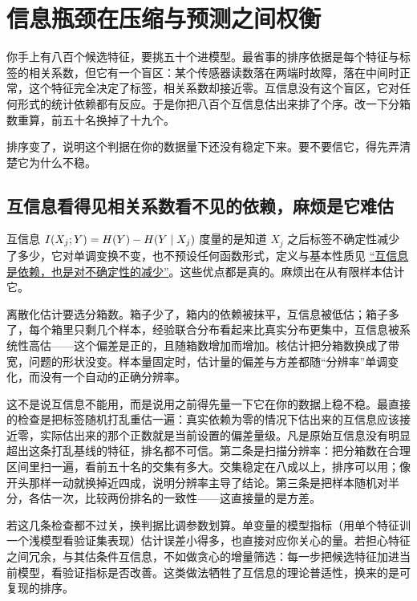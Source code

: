 \section{信息瓶颈在压缩与预测之间权衡}
\label{sec:13-Machine-Learning/11-Information-Theoretic-Learning/04}

你手上有八百个候选特征，要挑五十个进模型。最省事的排序依据是每个特征与标签的相关系数，但它有一个盲区：某个传感器读数落在两端时故障，落在中间时正常，这个特征完全决定了标签，相关系数却接近零。互信息没有这个盲区，它对任何形式的统计依赖都有反应。于是你把八百个互信息估出来排了个序。改一下分箱数重算，前五十名换掉了十九个。

排序变了，说明这个判据在你的数据量下还没有稳定下来。要不要信它，得先弄清楚它为什么不稳。

\subsection{互信息看得见相关系数看不见的依赖，麻烦是它难估}

互信息 \(I(X_j;Y)=H(Y)-H(Y\mid X_j)\) 度量的是知道 \(X_j\) 之后标签不确定性减少了多少，它对单调变换不变，也不预设任何函数形式，定义与基本性质见 \hyperref[sec:07-Information-Theory/02-Joint-Information/02]{``互信息是依赖，也是对不确定性的减少''}。这些优点都是真的。麻烦出在从有限样本估计它。

离散化估计要选分箱数。箱子少了，箱内的依赖被抹平，互信息被低估；箱子多了，每个箱里只剩几个样本，经验联合分布看起来比真实分布更集中，互信息被系统性高估——这个偏差是正的，且随箱数增加而增加。核估计把分箱数换成了带宽，问题的形状没变。样本量固定时，估计量的偏差与方差都随``分辨率''单调变化，而没有一个自动的正确分辨率。

这不是说互信息不能用，而是说用之前得先量一下它在你的数据上稳不稳。最直接的检查是把标签随机打乱重估一遍：真实依赖为零的情况下估出来的互信息应该接近零，实际估出来的那个正数就是当前设置的偏差量级。凡是原始互信息没有明显超出这条打乱基线的特征，排名都不可信。第二条是扫描分辨率：把分箱数在合理区间里扫一遍，看前五十名的交集有多大。交集稳定在八成以上，排序可以用；像开头那样一动就换掉近四成，说明分辨率主导了结论。第三条是把样本随机对半分，各估一次，比较两份排名的一致性——这直接量的是方差。

若这几条检查都不过关，换判据比调参数划算。单变量的模型指标（用单个特征训一个浅模型看验证集表现）估计误差小得多，也直接对应你关心的量。若担心特征之间冗余，与其估条件互信息，不如做贪心的增量筛选：每一步把候选特征加进当前模型，看验证指标是否改善。这类做法牺牲了互信息的理论普适性，换来的是可复现的排序。

